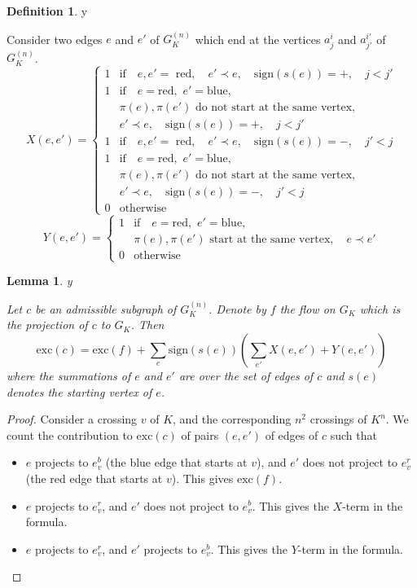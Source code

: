 \documentclass{amsart}
\theoremstyle{plain}
\newtheorem{lemma}[proposition]{Lemma}
\theoremstyle{definition}
\newtheorem{definition}[proposition]{Definition}
\theoremstyle{remark}
\def\printname#1{
        \if\draft y
                \smash{\makebox[0pt]{\hspace{-0.5in}
                        \raisebox{8pt}{\tt\tiny #1}}}
        \fi
}
\def\lbl#1{\label{#1}\printname{#1}}
\def\sign{\mathrm{sign}}
\def\exc{\mathrm{exc}}
\begin{document}
\begin{definition}
\lbl{def.XY}
Consider two edges $e$ and $e'$ of $G_K^{(n)}$ which end at the vertices
$a^i_j$ and $a^{i'}_{j'}$  of $G_K^{(n)}$. 
$$
X(e,e')=
\begin{cases}
1 & \text{if} \quad e, e'= \text{ red}, \quad 
e' \prec e, \quad \sign(s(e))= +, \quad j < j' \\
1 & \text{if} \quad e=\text{red}, \,\, e'=\text{blue},\,\, \\
& \pi(e), \pi(e') \,\, \text{do not start at the same vertex}, \\ 
& e' \prec e, \quad \sign(s(e))= +, \quad j < j' \\
1 & \text{if} \quad e,e'= \text{ red}, \quad
 e' \prec e, \quad \sign(s(e))= -, \quad 
j' <  j \\
1 & \text{if} \quad e=\text{red}, \,\, e'=\text{blue},\,\, \\
& \pi(e), \pi(e') \,\, \text{do not start at the same vertex}, \\ 
&  e' \prec e, \quad \sign(s(e))= -, \quad 
j' <  j \\
0 & \text{otherwise}
\end{cases}
$$
$$
Y(e,e')=
\begin{cases}
1 & \text{if} \quad e=\text{red}, \,\, e'=\text{blue},\,\, \\
& \pi(e), \pi(e') \,\, \text{start at the same vertex}, \quad e \prec e' \\
0 & \text{otherwise}
\end{cases}
$$
\end{definition}



\begin{lemma}
\lbl{lem.exc2}
Let $c$ be an admissible subgraph of $G_K^{(n)}$. 
Denote by $f$ the flow on $G_K$
which is the projection of $c$ to $G_K$. Then 
$$
\exc(c)=\exc(f) + \sum_{e}\sign(s(e)) \left(\sum_{e'}
X(e,e')+Y(e,e') \right) 
$$
where the summations of $e$ and $e'$ are over the set of edges of $c$ and
$s(e)$ denotes the starting vertex of $e$. 
\end{lemma}


\begin{proof}
Consider a crossing $v$ of $K$, and the corresponding $n^2$ crossings
of $K^n$. 
We count the contribution to  
$\exc(c)$ of pairs $(e,e')$ of edges of $c$ such that
\begin{itemize}
\item
$e$ projects to $e^b_v$ (the blue edge that starts at $v$),
and $e'$ does not project 
 to $e^r_v$ (the red edge that starts at $v$). This
gives $\exc(f)$.
\item
$e$ projects to $e^r_v$, and $e'$ does not project to $e^b_v$. This
gives the $X$-term in the formula. 
\item
$e$ projects to $e^r_v$, and $e'$  projects to $e^b_v$. 
This gives the $Y$-term in the formula. 
\end{itemize}
\end{proof}
\end{document}

